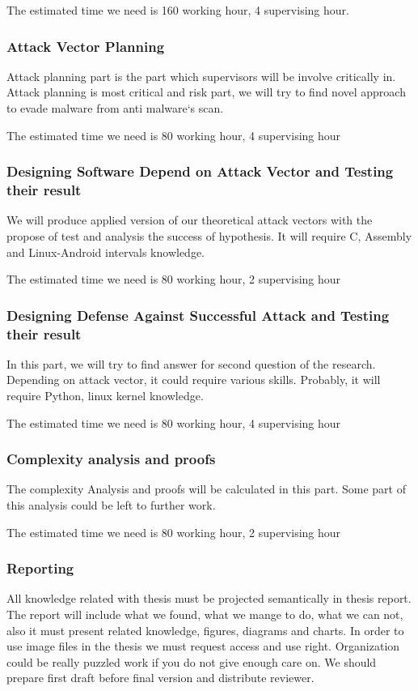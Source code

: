 The estimated time we need is 160 working hour, 4 supervising hour.
\subsubsection{Attack Vector Planning}
Attack planning part is the part which supervisors will be involve critically in. Attack planning is most critical and risk part, we will try to find novel approach to evade malware from anti malware`s scan. 

The estimated time we need is 80 working hour, 4 supervising hour
\subsubsection{Designing  Software Depend on Attack Vector and Testing their result}
We will produce applied version of our theoretical attack vectors with the propose of test and analysis the success of hypothesis. It will require C, Assembly and Linux-Android intervals knowledge.

The estimated time we need is 80 working hour, 2 supervising hour 
\subsubsection{Designing  Defense Against Successful Attack and Testing their result}
In this part, we will try to find answer for second question of the research. Depending on attack vector, it could require various skills. Probably, it will require Python, linux kernel knowledge.

The estimated time we need is 80 working hour, 4 supervising hour 
\subsubsection{Complexity analysis and proofs}
The complexity Analysis and proofs will be calculated in this part. Some part of this analysis could be left to further work. 

The estimated time we need is 80 working hour, 2 supervising hour 

\subsubsection{Reporting}
All knowledge related with thesis must be projected semantically in thesis report. The report will include what we found, what we mange to do, what we can not, also it must present related knowledge, figures, diagrams and charts. In order to use image files in the thesis we must request access and use right. Organization could be really puzzled work if you do not give enough care on. We should prepare first draft before final version and distribute reviewer.  

